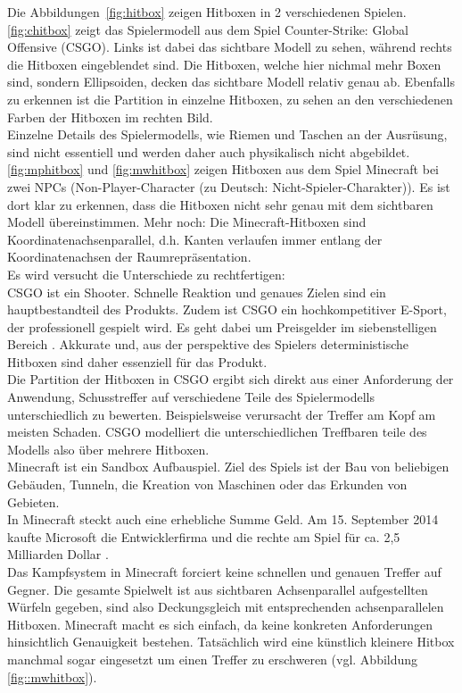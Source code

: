 Die Abbildungen~\ref{fig:hitbox} zeigen Hitboxen in 2 verschiedenen Spielen.\\
\ref{fig:chitbox} zeigt das Spielermodell aus dem Spiel Counter-Strike: Global Offensive (CSGO). Links ist dabei das sichtbare Modell zu sehen, während rechts die Hitboxen eingeblendet sind. Die Hitboxen, welche hier nichmal mehr Boxen sind, sondern Ellipsoiden, decken das sichtbare Modell relativ genau ab. Ebenfalls zu erkennen ist die Partition in einzelne Hitboxen, zu sehen an den verschiedenen Farben der Hitboxen im rechten Bild.\\
Einzelne Details des Spielermodells, wie Riemen und Taschen an der Ausrüsung, sind nicht essentiell und werden daher auch physikalisch nicht abgebildet.\\
\ref{fig:mphitbox} und \ref{fig:mwhitbox} zeigen Hitboxen aus dem Spiel Minecraft bei zwei NPCs (Non-Player-Character (zu Deutsch: Nicht-Spieler-Charakter)). Es ist dort klar zu erkennen, dass die Hitboxen nicht sehr genau mit dem sichtbaren Modell übereinstimmen. Mehr noch: Die Minecraft-Hitboxen sind Koordinatenachsenparallel, d.h. Kanten verlaufen immer entlang der Koordinatenachsen der Raumrepräsentation.\\
Es wird versucht die Unterschiede zu rechtfertigen:\\
CSGO ist ein Shooter. Schnelle Reaktion und genaues Zielen sind ein hauptbestandteil des Produkts. Zudem ist CSGO ein hochkompetitiver E-Sport, der professionell gespielt wird. Es geht dabei um Preisgelder im siebenstelligen Bereich \cite{csgoprice}. Akkurate und, aus der perspektive des Spielers deterministische Hitboxen sind daher essenziell für das Produkt.\\
Die Partition der Hitboxen in CSGO ergibt sich direkt aus einer Anforderung der Anwendung, Schusstreffer auf verschiedene Teile des Spielermodells unterschiedlich zu bewerten. Beispielsweise verursacht der Treffer am Kopf am meisten Schaden. CSGO modelliert die unterschiedlichen Treffbaren teile des Modells also über mehrere Hitboxen.\\
Minecraft ist ein Sandbox Aufbauspiel. Ziel des Spiels ist der Bau von beliebigen Gebäuden, Tunneln, die Kreation von Maschinen oder das Erkunden von Gebieten.\\
In Minecraft steckt auch eine erhebliche Summe Geld. Am 15. September 2014 kaufte Microsoft die Entwicklerfirma und die rechte am Spiel für ca. 2,5 Milliarden Dollar \cite{buyminecraft}.\\
Das Kampfsystem in Minecraft forciert keine schnellen und genauen Treffer auf Gegner. Die gesamte Spielwelt ist aus sichtbaren Achsenparallel aufgestellten Würfeln gegeben, sind also Deckungsgleich mit entsprechenden achsenparallelen Hitboxen. Minecraft macht es sich einfach, da keine konkreten Anforderungen hinsichtlich Genauigkeit bestehen. Tatsächlich wird eine künstlich kleinere Hitbox manchmal sogar eingesetzt um einen Treffer zu erschweren (vgl. Abbildung \ref{fig::mwhitbox}).\\

